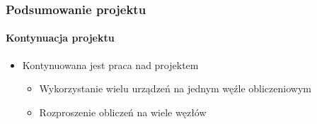 \documentclass[12pt,handout]{beamer}
\begin{document}
\begin{frame}
\frametitle{Podsumowanie projektu}
\framesubtitle{Kontynuacja projektu}
\begin{itemize}
\item Kontynuowana jest praca nad projektem
	\begin{itemize}
	\item Wykorzystanie wielu urządzeń na jednym węźle obliczeniowym
	\item Rozproszenie obliczeń na wiele węzłów
	\end{itemize}
\end{itemize}
\end{frame}
\end{document}
